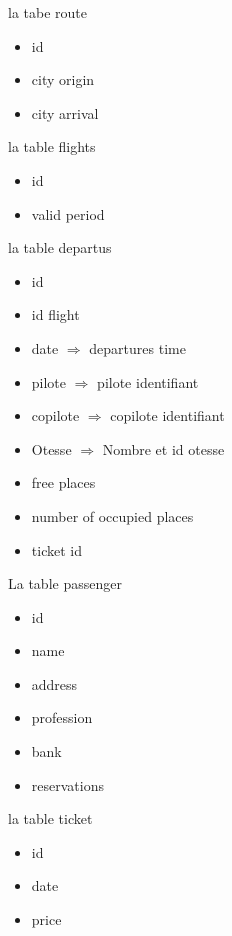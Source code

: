 la tabe route
    \begin{itemize}
        \centering
        \item id 
        \item city origin
        \item city arrival
    \end{itemize}

la table flights
    \begin{itemize}
        \centering
        \item id
        \item valid period
    \end{itemize}

la table departus
    \begin{itemize}
        \centering
        \item id 
        \item id flight 
        \item date $\Rightarrow$ departures time
        \item pilote $\Rightarrow$ pilote identifiant
        \item copilote $\Rightarrow$ copilote identifiant
        \item Otesse $\Rightarrow$ Nombre et id otesse
        \item free places
        \item number of occupied places
        \item ticket id
    \end{itemize}

La table passenger 
    \begin{itemize}
        \centering
        \item id 
        \item name
        \item address
        \item profession
        \item bank 
        \item reservations
    \end{itemize}
la table ticket 
    \begin{itemize}
        \centering
        \item id 
        \item date
        \item price
    \end{itemize}
    